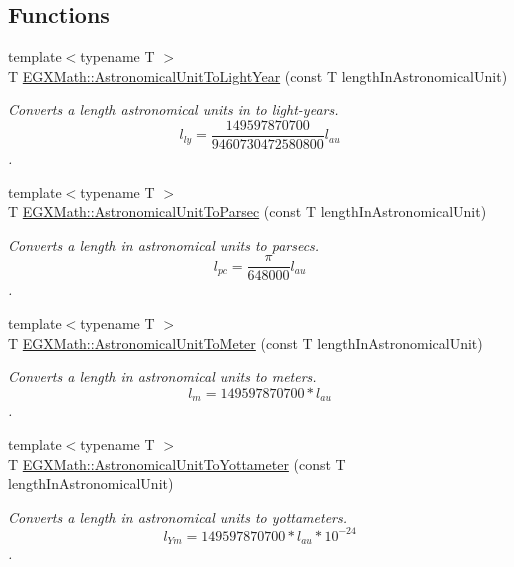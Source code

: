 \subsection*{Functions}
\begin{DoxyCompactItemize}
\item 
{\footnotesize template$<$typename T $>$ }\\T \mbox{\hyperlink{group___e_g_x_math-_conversions-_length_conversions-_astronomical-_astronomical_unit-_astronomical_ga3ef6f77258333914d94d01c4a963ad2e}{E\+G\+X\+Math\+::\+Astronomical\+Unit\+To\+Light\+Year}} (const T length\+In\+Astronomical\+Unit)
\begin{DoxyCompactList}\small\item\em Converts a length astronomical units in to light-\/years. \[ l_{ly}= \frac{149597870700}{9460730472580800} l_{au} \]. \end{DoxyCompactList}\item 
{\footnotesize template$<$typename T $>$ }\\T \mbox{\hyperlink{group___e_g_x_math-_conversions-_length_conversions-_astronomical-_astronomical_unit-_astronomical_gabcd5dd0effb649f31e9e4e3091679cdd}{E\+G\+X\+Math\+::\+Astronomical\+Unit\+To\+Parsec}} (const T length\+In\+Astronomical\+Unit)
\begin{DoxyCompactList}\small\item\em Converts a length in astronomical units to parsecs. \[ l_{pc}=\frac{\pi}{648000} l_{au} \]. \end{DoxyCompactList}\item 
{\footnotesize template$<$typename T $>$ }\\T \mbox{\hyperlink{group___e_g_x_math-_conversions-_length_conversions-_astronomical-_astronomical_unit-_s_i_gafa85cf1b3dc583681c13501fa9d923ff}{E\+G\+X\+Math\+::\+Astronomical\+Unit\+To\+Meter}} (const T length\+In\+Astronomical\+Unit)
\begin{DoxyCompactList}\small\item\em Converts a length in astronomical units to meters. \[ l_{m}=149597870700 * l_{au} \]. \end{DoxyCompactList}\item 
{\footnotesize template$<$typename T $>$ }\\T \mbox{\hyperlink{group___e_g_x_math-_conversions-_length_conversions-_astronomical-_astronomical_unit-_s_i_ga4cb2d4b1c5fef83c15a4737cef4b22e2}{E\+G\+X\+Math\+::\+Astronomical\+Unit\+To\+Yottameter}} (const T length\+In\+Astronomical\+Unit)
\begin{DoxyCompactList}\small\item\em Converts a length in astronomical units to yottameters. \[ l_{Ym}=149597870700 * l_{au} * 10^{-24} \]. \end{DoxyCompactList}\item 

\end{DoxyCompactItemize}
